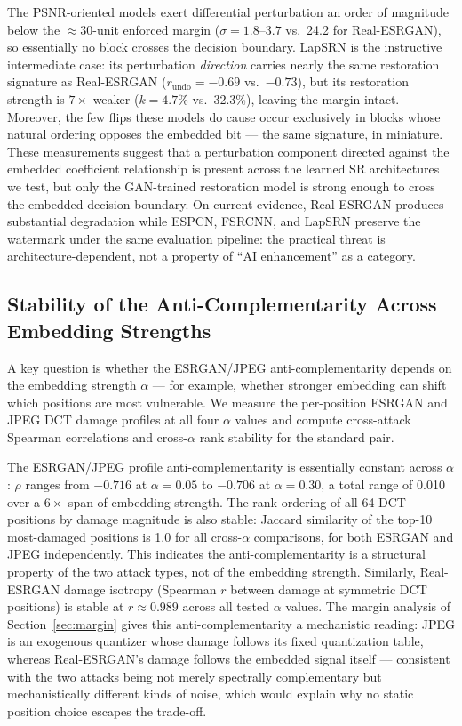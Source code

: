 \documentclass[conference]{IEEEtran}
\begin{document}
The PSNR-oriented models exert differential perturbation an order of
magnitude below the $\approx$30-unit enforced margin
($\sigma = 1.8$--$3.7$ vs.\ 24.2 for Real-ESRGAN), so essentially no
block crosses the decision boundary. LapSRN is the instructive
intermediate case: its perturbation \emph{direction} carries nearly the
same restoration signature as Real-ESRGAN
($r_{\mathrm{undo}} = -0.69$ vs.\ $-0.73$), but its restoration
strength is $7\times$ weaker ($k = 4.7\%$ vs.\ 32.3\%), leaving the
margin intact. Moreover, the few flips these models do cause occur
exclusively in blocks whose natural ordering opposes the embedded bit
--- the same signature, in miniature. These measurements suggest that
a perturbation component directed against the embedded coefficient
relationship is present across the learned SR architectures we test,
but only the GAN-trained restoration model is strong enough to cross
the embedded decision boundary. On current evidence, Real-ESRGAN
produces substantial degradation while ESPCN, FSRCNN, and LapSRN
preserve the watermark under the same evaluation pipeline: the
practical threat is architecture-dependent, not a property of ``AI
enhancement'' as a category.

\subsection{Stability of the Anti-Complementarity Across Embedding Strengths}

A key question is whether the ESRGAN/JPEG anti-complementarity depends
on the embedding strength $\alpha$ --- for example, whether stronger
embedding can shift which positions are most vulnerable. We measure the
per-position ESRGAN and JPEG DCT damage profiles at all four $\alpha$
values and compute cross-attack Spearman correlations and cross-$\alpha$
rank stability for the standard pair.

The ESRGAN/JPEG profile anti-complementarity is essentially constant
across $\alpha$: $\rho$ ranges from $-0.716$ at $\alpha=0.05$ to
$-0.706$ at $\alpha=0.30$, a total range of 0.010 over a $6\times$ span
of embedding strength. The rank ordering of all 64 DCT positions by
damage magnitude is also stable: Jaccard similarity of the top-10
most-damaged positions is 1.0 for all cross-$\alpha$ comparisons, for
both ESRGAN and JPEG independently. This indicates the anti-complementarity
is a structural property of the two attack types, not of the embedding
strength. Similarly, Real-ESRGAN damage isotropy (Spearman $r$ between
damage at symmetric DCT positions) is stable at $r \approx 0.989$
across all tested $\alpha$ values. The margin analysis of
Section~\ref{sec:margin} gives this anti-complementarity a mechanistic
reading: JPEG is an exogenous quantizer whose damage follows its fixed
quantization table, whereas Real-ESRGAN's damage follows the embedded
signal itself --- consistent with the two attacks being not merely
spectrally complementary but mechanistically different kinds of noise,
which would explain why no static position choice escapes the
trade-off.
\end{document}
